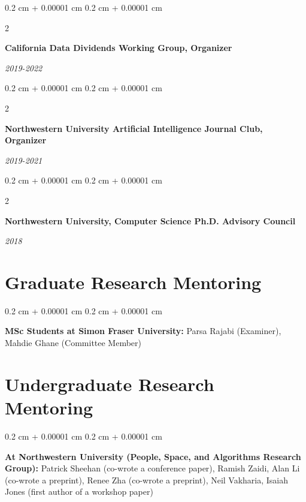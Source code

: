 \documentclass[10pt, letterpaper]{article}
\newenvironment{onecolentry}{
    \begin{adjustwidth}{
        0.2 cm + 0.00001 cm
    }{
        0.2 cm + 0.00001 cm
    }
}{
    \end{adjustwidth}
} %
\newenvironment{twocolentry}[2][]{
    \onecolentry
    \def\secondColumn{#2}
    \setcolumnwidth{\fill, 4.1 cm}
    \begin{paracol}{2}
}{
    \switchcolumn \raggedleft \secondColumn
    \end{paracol}
    \endonecolentry
} %
\begin{document}
        
        \begin{twocolentry}{
            
            
        \textit{2019-2022}}
            \textbf{California Data Dividends Working Group, Organizer}
        \end{twocolentry}



        \vspace{0.2 cm}

        \begin{twocolentry}{
            
            
        \textit{2019-2021}}
            \textbf{Northwestern University Artificial Intelligence Journal Club, Organizer}
        \end{twocolentry}



        \vspace{0.2 cm}

        \begin{twocolentry}{
            
            
        \textit{2018}}
            \textbf{Northwestern University, Computer Science Ph.D. Advisory Council}
        \end{twocolentry}




    
    \section{Graduate Research Mentoring}



        
        \begin{onecolentry}
            \textbf{MSc Students at Simon Fraser University:} Parsa Rajabi (Examiner), Mahdie Ghane (Committee Member)
        \end{onecolentry}


    
    \section{Undergraduate Research Mentoring}



        
        \begin{onecolentry}
            \textbf{At Northwestern University (People, Space, and Algorithms Research Group):} Patrick Sheehan (co-wrote a conference paper), Ramish Zaidi, Alan Li (co-wrote a preprint), Renee Zha (co-wrote a preprint), Neil Vakharia, Isaiah Jones (first author of a workshop paper)
        \end{onecolentry}
\end{document}
